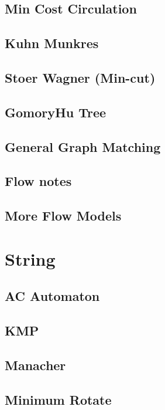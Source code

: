 \subsection{Min Cost Circulation}

\subsection{Kuhn Munkres}

\subsection{Stoer Wagner (Min-cut)}

\subsection{GomoryHu Tree}

\subsection{General Graph Matching}

\subsection{Flow notes}

\subsection{More Flow Models}


\section{String}
\subsection{AC Automaton}

\subsection{KMP}

\subsection{Manacher}

\subsection{Minimum Rotate}

